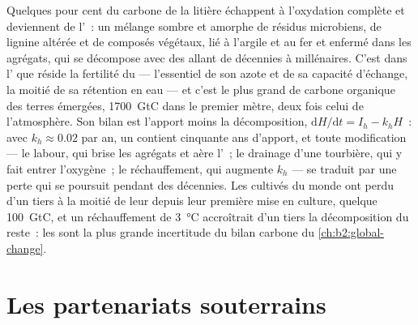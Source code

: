 \begin{proposition}\label{prop:b2:living-soil:humus}
Quelques pour cent du carbone de la litière échappent à l'oxydation
complète et deviennent de l'\emph{}~: un mélange sombre et amorphe de
résidus microbiens, de lignine altérée et de composés végétaux, lié à
l'argile et au fer et enfermé dans les agrégats, qui se décompose avec des
 allant de décennies à millénaires. C'est dans l'
que réside la fertilité du 
--- l'essentiel de son azote et de sa capacité d'échange, la moitié de sa
rétention en eau --- et c'est le plus grand  de carbone
organique des terres émergées,
\qty{1700}{GtC} dans le premier mètre, deux fois celui de l'atmosphère. Son
bilan est l'apport moins la décomposition, $\mathrm{d}H/\mathrm{d}t = I_h - k_hH$~:
avec $k_h \approx 0.02$ par an, un  contient cinquante ans d'apport,
et toute modification --- le labour, qui brise les agrégats et aère
l'~; le drainage d'une tourbière, qui y fait entrer l'oxygène~; le
réchauffement, qui augmente $k_h$ --- se traduit par une perte qui se
poursuit pendant des décennies. Les  cultivés du monde ont perdu d'un
tiers à la moitié de leur  depuis leur première mise en culture,
quelque
\qty{100}{GtC}, et un réchauffement de \qty{3}{\celsius} accroîtrait d'un
tiers la décomposition du reste~: les  sont la plus grande incertitude
du bilan carbone du \cref{ch:b2:global-change}.
\end{proposition}

\section{Les partenariats souterrains}

